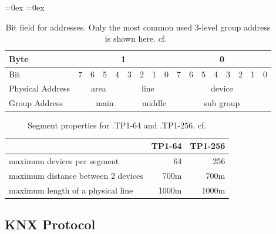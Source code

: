 \begin{table}
	\aboverulesep=0ex
	\belowrulesep=0ex
	\renewcommand{\arraystretch}{1.2}
	
	\centering
	\begin{tabular}{|l|c|c|c|c|c|c|c|c|c|c|c|c|c|c|c|c|}
		\toprule
		Byte & \multicolumn{8}{c|}{1} & \multicolumn{8}{c|}{0} \\\midrule
		Bit & 7 & 6 & 5 & 4 & 3 & 2 & 1 & 0 & 7 & 6 & 5 & 4 & 3 & 2 & 1 & 0\\\midrule
		Physical Address & \multicolumn{4}{c|}{area} & \multicolumn{4}{c|}{line} & \multicolumn{8}{c|}{device}\\\midrule
		Group Address & \multicolumn{5}{c|}{main} & \multicolumn{3}{c|}{middle} & \multicolumn{8}{c|}{sub group}\\
		\bottomrule
	\end{tabular}
	\caption[Bit field for \knx addresses]{Bit field for \knx addresses. Only the most common used 3-level group address is shown here. cf.~\textcite{Merz2009,Sokollik2017} }
	\label{tab:background:bas:knx:topo:addr}
\end{table}

\begin{table}
	\centering
	\begin{tabular}{l r r }
	 & \textbf{TP1-64} & \textbf{TP1-256} \\\toprule
	 maximum devices per segment & 64 & 256 \\
	 maximum distance between 2 devices & 700m & 700m \\
	 maximum length of a physical line & 1000m & 1000m \\
	 \bottomrule
	\end{tabular}
	\caption[Segment properties for \knx.TP1-64 and \knx.TP1-256]{Segment properties for \knx.TP1-64 and \knx.TP1-256. cf. \textcite{Sokollik2017} }
	\label{tab:background:bas:knx:topo:tpsegments}
\end{table}
	
\subsection{KNX Protocol}
\label{sec:background:bas:knx:proto}

